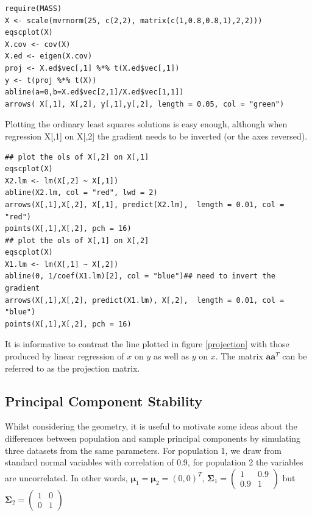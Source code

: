 \singlespacing
\begin{verbatim}
require(MASS)
X <- scale(mvrnorm(25, c(2,2), matrix(c(1,0.8,0.8,1),2,2)))
eqscplot(X)
X.cov <- cov(X)
X.ed <- eigen(X.cov)
proj <- X.ed$vec[,1] %*% t(X.ed$vec[,1])
y <- t(proj %*% t(X))
abline(a=0,b=X.ed$vec[2,1]/X.ed$vec[1,1])
arrows( X[,1], X[,2], y[,1],y[,2], length = 0.05, col = "green")
\end{verbatim}
\onehalfspacing

Plotting the ordinary least squares solutions is easy enough, although when regression X[,1] on X[,2] the gradient needs to be inverted (or the axes reversed).

\singlespacing
\begin{verbatim}
## plot the ols of X[,2] on X[,1]
eqscplot(X)
X2.lm <- lm(X[,2] ~ X[,1])
abline(X2.lm, col = "red", lwd = 2)
arrows(X[,1],X[,2], X[,1], predict(X2.lm),  length = 0.01, col = "red")
points(X[,1],X[,2], pch = 16)
## plot the ols of X[,1] on X[,2]
eqscplot(X)
X1.lm <- lm(X[,1] ~ X[,2])
abline(0, 1/coef(X1.lm)[2], col = "blue")## need to invert the gradient
arrows(X[,1],X[,2], predict(X1.lm), X[,2],  length = 0.01, col = "blue")
points(X[,1],X[,2], pch = 16)
\end{verbatim}
\onehalfspacing


It is informative to contrast the line plotted in figure \ref{projection} with those produced by linear regression of $x$ on $y$ as well as $y$ on $x$.
The matrix $ \boldsymbol{a} \boldsymbol{a}^{T} $ can be referred to as the projection matrix.   

\subsection{Principal Component Stability}
\label{sec:pcastability}

Whilst considering the geometry, it is useful to motivate some ideas about the differences between population and sample principal components by simulating three datasets from the same parameters.   For population 1, we draw from standard normal variables with correlation of 0.9, for population 2 the variables are uncorrelated.   In other words, $\boldsymbol{\mu}_{1} = \boldsymbol{\mu}_{2} = (0,0)^{T}$, $\boldsymbol{\Sigma}_{1} = \left(\begin{array}{rr} 1 & 0.9 \\ 0.9 & 1 \end{array} \right)$ but $\boldsymbol{\Sigma}_{2} = \left(\begin{array}{rr} 1 & 0 \\ 0 & 1 \end{array} \right)$

